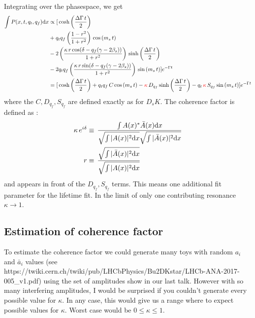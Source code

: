 Integrating over the phasespace, we get
\begin{align*}
	\int P(x,t,q_t,q_f) \text d x &\propto   [
	\, \text{cosh} \left( \frac{\Delta \Gamma \, t}{2}\right) \\
	 & + q_t q_f \left( \frac{1-r^2}{1+r^2} \right) \, \text{cos} \left( m_s \, t \right)  \\
	 & -2 \left( \frac{\kappa \, r \, \text{cos}(\delta - q_f(\gamma - 2 \beta_s))}{1+r^2}  \right) \, \text{sinh} \left( \frac{\Delta \Gamma \, t}{2}\right)  \\
	 & -2 q_t q_f \left( \frac{\kappa \, r \, \text{sin}(\delta - q_f(\gamma - 2 \beta_s))}{1+r^2}   \right)\, \text{sin} \left( m_s \, t \right)  ]  e^{- \Gamma t} \\
	 &=   [
	\, \text{cosh} \left( \frac{\Delta \Gamma \, t}{2}\right) 
	  + q_t q_f \, C \, \text{cos} \left( m_s \, t \right)  
	  - \textcolor{red}{\kappa} \, D_{q_f} \, \text{sinh} \left( \frac{\Delta \Gamma \, t}{2}\right)  
	  - q_t \, \textcolor{red}{\kappa} \, S_{q_f}\, \text{sin} \left( m_s \, t \right)  ]  e^{- \Gamma t}
\end{align*}
where the $C,D_{q_f},S_{q_f}$ are defined exactly as for $D_s K$.
The coherence factor is defined as :
\begin{align}
	\kappa \, e^{i\delta} &\equiv \, \frac{\int A(x)^{*}  \bar A(x)  \text d x}{\sqrt{\int \vert A(x) \vert^2\text d x} \sqrt{\int \vert \bar A(x) \vert^2\text d x}  } \\
	r &\equiv \, \frac{\sqrt{\int \vert \bar A(x) \vert^2\text d x }}{\sqrt{\int \vert A(x) \vert^2\text d x}} 
\end{align}
and appears in front of the $D_{q_f},S_{q_f}$  terms.
This means one additional fit parameter for the lifetime fit.
In the limit of only one contributing resonance $\kappa \to 1$. \\


\subsection{Estimation of coherence factor}

To estimate the coherence factor we could generate many toys with random $a_i$ and $\bar a_i$ values (see https://twiki.cern.ch/twiki/pub/LHCbPhysics/Bu2DKstar/LHCb-ANA-2017-005\_v1.pdf) using the set of amplitudes show in our last talk. However with so many interfering amplitudes, I would be surprised if you couldn't generate every possible value for $\kappa$. In any case, this would give us a  range where to expect possible values for $\kappa$. Worst case would be $0 \leq \kappa \leq 1$. \\

